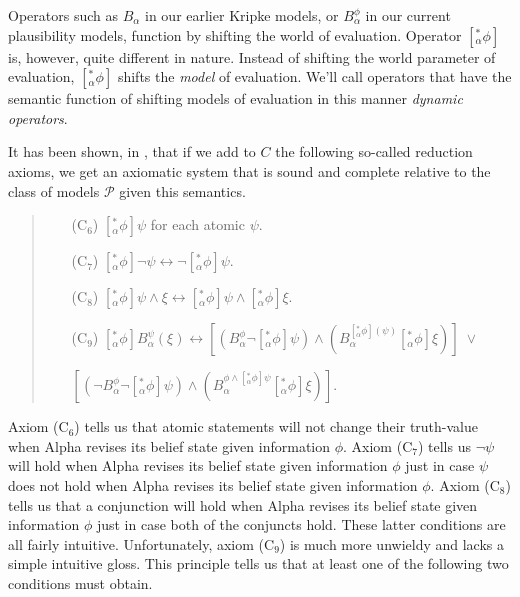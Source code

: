 Operators such as $B_\alpha$ in our earlier Kripke models, or $B_\alpha^\phi$ in our current plausibility models, function by shifting the world of evaluation.
Operator $[^*_\alpha \phi]$ is, however, quite different in nature. 
Instead of shifting the world parameter of evaluation, $[^*_\alpha \phi]$ shifts the \textit{model} of evaluation.
We'll call operators that have the semantic function of shifting models of evaluation in this manner \textit{dynamic operators}.

It has been shown, in \citet{vanBentham}, that if we add to $C$ the following so-called reduction axioms, we get an axiomatic system that is sound and complete relative to the class of models $\mathcal{P}$ given this semantics.
\begin{quote}
\begin{itemize}
\item[(C$_6$)]\quad $[^*_\alpha \phi] \psi$ for each atomic $\psi$.
\item[(C$_7$)]\quad $[^*_\alpha \phi] \lnot \psi \leftrightarrow \lnot [^*_\alpha \phi] \psi$.
\item[(C$_8$)]\quad $[^*_\alpha \phi] \psi \wedge \xi \leftrightarrow [^*_\alpha \phi] \psi \wedge [^*_\alpha \phi] \xi$.
\item[(C$_9$)]\quad $[^*_\alpha \phi] B_\alpha^\psi(\xi) \leftrightarrow [(B_\alpha^\phi \lnot [^*_\alpha \phi] \psi) \wedge (B_\alpha^{[^*_\alpha \phi](\psi)} [^*_\alpha \phi]\xi)] \; \vee$
\item[]\hfill $[(\lnot B_\alpha^\phi \lnot [^*_\alpha \phi]\psi ) \wedge (B_\alpha^{\phi \wedge [^*_\alpha \phi] \psi} [^*_\alpha \phi]\xi)]$.
\end{itemize}
\end{quote}
Axiom (C$_6$) tells us that atomic statements will not change their truth-value when Alpha revises its belief state given information $\phi$.
Axiom (C$_7$) tells us $\lnot \psi$ will hold when  Alpha revises its belief state given information $\phi$ just in case $\psi$ does not hold when Alpha revises its belief state given information $\phi$.
Axiom (C$_8$) tells us that a conjunction will hold when Alpha revises its belief state given information $\phi$ just in case both of the conjuncts hold.
These latter conditions are all fairly intuitive.
Unfortunately, axiom (C$_9$) is much more unwieldy and lacks a simple intuitive gloss. 
This principle tells us that at least one of the following two conditions must obtain.

